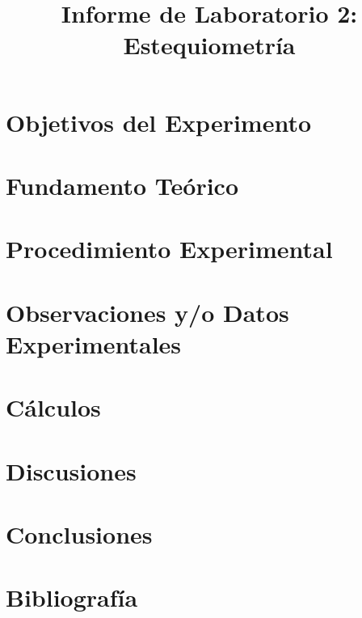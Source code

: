 \documentclass{article}
\title{Informe de Laboratorio 2: Estequiometría}
\begin{document}

\tableofcontents
\section{Objetivos del Experimento} %

\section{Fundamento Teórico} %

\section{Procedimiento Experimental} %

\section{Observaciones y/o Datos Experimentales} %

\section{Cálculos} %

\section{Discusiones} %

\section{Conclusiones} %

\section{Bibliografía} %

\newpage
\listoffigures
\listoftables
\end{document}

